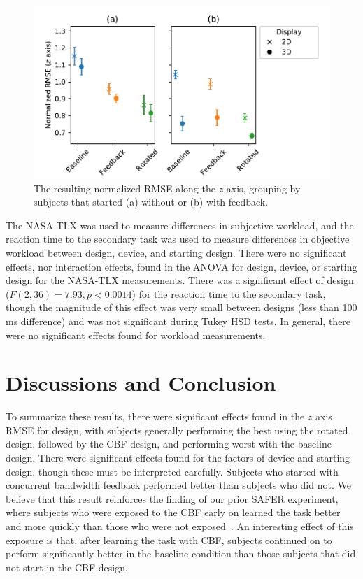 \begin{figure}[tb!]
    \begin{center}
        \includegraphics[width=\linewidth]{figures/AR/x_design_y_zrmse_hue_device_col_cbf_first.png}
        \caption[The resulting normalized RMSE along the $z$ axis]{The resulting normalized RMSE along the $z$ axis, grouping by subjects that started (a) without or (b) with feedback.}
        \label{fig:zrmseanovas2}
    \end{center}
\end{figure}

The NASA-TLX was used to measure differences in subjective workload, and the reaction time to the secondary task was used to measure differences in objective workload between design, device, and starting design.
There were no significant effects, nor interaction effects, found in the ANOVA for design, device, or starting design for the NASA-TLX measurements.
There was a significant effect of design ($F(2, 36)=7.93, p<0.0014$) for the reaction time to the secondary task, though the magnitude of this effect was very small between designs (less than 100 ms difference) and was not significant during Tukey HSD tests.
In general, there were no significant effects found for workload measurements.

\section{Discussions and Conclusion}
To summarize these results, there were significant effects found in the $z$ axis RMSE for design, with subjects generally performing the best using the rotated design, followed by the CBF design, and performing worst with the baseline design.
There were significant effects found for the factors of device and starting design, though these must be interpreted carefully.
Subjects who started with concurrent bandwidth feedback performed better than subjects who did not.
We believe that this result reinforces the finding of our prior SAFER experiment, where subjects who were exposed to the CBF early on learned the task better and more quickly than those who were not exposed~\citep{karasinski_real-time_2016,karasinski_development_2016,karasinski_real-time_2017}.
An interesting effect of this exposure is that, after learning the task with CBF, subjects continued on to perform significantly better in the baseline condition than those subjects that did not start in the CBF design.


